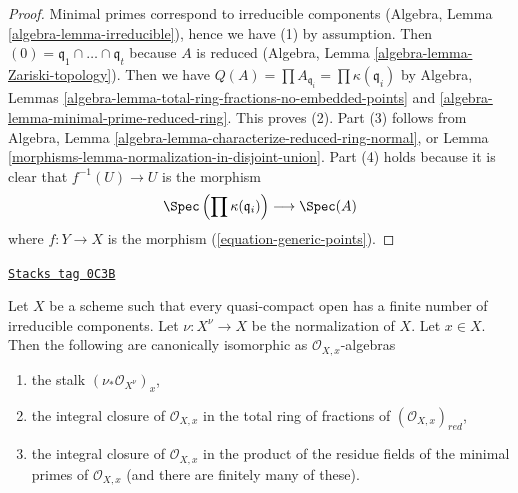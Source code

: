 \begin{proof}

Minimal primes correspond to irreducible components
(Algebra, Lemma \ref{algebra-lemma-irreducible}),
hence we have (1) by assumption. Then
$(0) = \mathfrak q_1 \cap \ldots \cap \mathfrak q_t$ because $A$ is reduced
(Algebra, Lemma \ref{algebra-lemma-Zariski-topology}).
Then we have
$Q(A) = \prod A_{\mathfrak q_i} = \prod \kappa(\mathfrak q_i)$
by Algebra, Lemmas \ref{algebra-lemma-total-ring-fractions-no-embedded-points}
and \ref{algebra-lemma-minimal-prime-reduced-ring}.
This proves (2). Part (3) follows from
Algebra, Lemma \ref{algebra-lemma-characterize-reduced-ring-normal},
or Lemma \ref{morphisms-lemma-normalization-in-disjoint-union}.
Part (4) holds because it is clear that $f^{-1}(U) \to U$ is the morphism
$$
\Spec\left(\prod \kappa(\mathfrak q_i)\right)
\longrightarrow
\Spec(A)
$$
where $f : Y \to X$ is the morphism (\ref{equation-generic-points}).
\end{proof}

\begin{lemma}
\label{morphisms-lemma-stalk-normalization}
\href{https://stacks.math.columbia.edu/tag/0C3B}{\texttt{Stacks tag 0C3B}}

Let $X$ be a scheme such that every quasi-compact open has a finite
number of irreducible components. Let $\nu : X^\nu \to X$
be the normalization of $X$. Let $x \in X$. Then the following
are canonically isomorphic as $\mathcal{O}_{X, x}$-algebras
\begin{enumerate}
\item the stalk $(\nu_*\mathcal{O}_{X^\nu})_x$,
\item the integral closure of $\mathcal{O}_{X, x}$ in
the total ring of fractions of $(\mathcal{O}_{X, x})_{red}$,
\item the integral closure of $\mathcal{O}_{X, x}$ in the product
of the residue fields of the minimal primes of $\mathcal{O}_{X, x}$
(and there are finitely many of these).
\end{enumerate}
\end{lemma}

